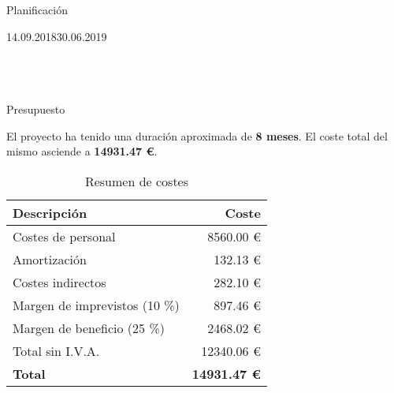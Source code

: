 \begin{frame}{Planificación}
{\begin{ganttchart}[y unit title=0.7cm,y unit chart=0.6cm,x unit= 0.7 mm, 			hgrid=true, time slot format={little-endian}]{14.09.2018}{30.06.2019}
	\\
	\\
	\\
	
	
	\\ 
	
	
	

	
  \end{ganttchart}
  }

\end{frame}



\begin{frame}{Presupuesto}

El proyecto ha tenido una duración aproximada de \textbf{8 meses}. El coste total del mismo asciende a \textbf{14931.47 \euro }.

\begin{table}[h]
\centering
		\begin{tabular}{|l|r|}
		\hline 
		Descripción & Coste\\
		\hline
		\hline
		Costes de personal & 8560.00 \euro  \\
		\hline		
		Amortización & 132.13 \euro  \\
		\hline
		Costes indirectos & 282.10  \euro \\
		\hline
		Margen de imprevistos (10 \%{}) & 897.46 \euro  \\
		\hline 
		Margen de beneficio (25 \%{}) & 2468.02 \euro  \\
		\hline
		\hline
		Total sin I.V.A. & 12340.06 \euro \\
		\hline
		\hline
		\textbf{Total} & \textbf{14931.47 \euro } \\		
		\hline
		\end{tabular}
		\caption{Resumen de costes}
\end{table}

\end{frame}


